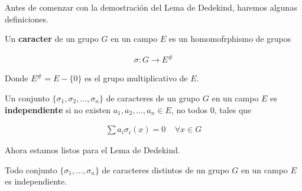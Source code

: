 Antes de comenzar con la demostración del Lema de Dedekind, haremos
algunas definiciones.

\begin{definicion} 
    Un \textbf{caracter} de un grupo $G$ en un campo $E$ es un homomofrphismo de grupos
    
    \begin{align}
            \sigma: G \longrightarrow E^{\#}
    \end{align}
    
    Donde $E^{\#} = E - \{0\}$ es el grupo multiplicativo de $E$.
\end{definicion}

\begin{definicion}
    Un conjunto $\{\sigma_1 , \sigma_2, \dots, \sigma_n\}$ de caracteres de un grupo $G$ en un campo $E$ es
    \textbf{independiente} si no existen $a_1, a_2, \dots, a_n \in E$, no todos 0, tales que 
    
    \begin{align}
            \sum a_i \sigma_i(x) = 0 \;\;\;\; \forall x \in G 
    \end{align}\par\null
    
\end{definicion}

Ahora estamos listos para el Lema de Dedekind.

\begin{lema}[Dedekind]
    Todo conjunto $\{\sigma_1, \dots, \sigma_n\}$ de caracteres distintos de un grupo $G$ en un campo $E$ es independiente.
\end{lema}

